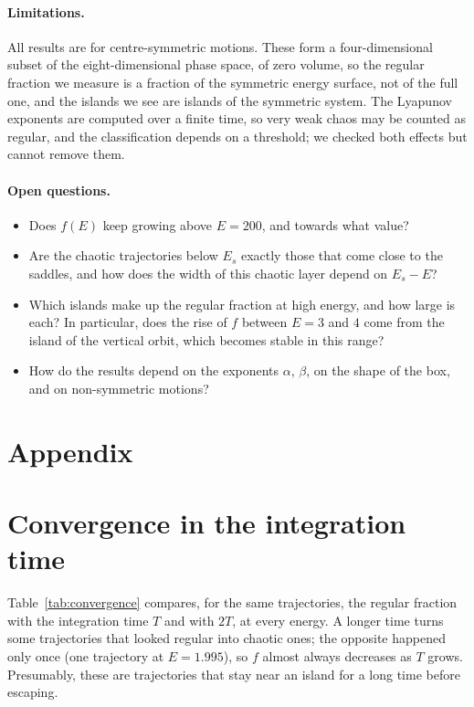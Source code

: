 \documentclass[11pt,a4paper]{article}
\begin{document}
\paragraph{Limitations.}
All results are for centre-symmetric motions. These form a
four-dimensional subset of the eight-dimensional phase space, of zero
volume, so the regular fraction we measure is a fraction of the symmetric
energy surface, not of the full one, and the islands we see are islands of
the symmetric system. The Lyapunov exponents are computed over a finite
time, so very weak chaos may be counted as regular, and the classification
depends on a threshold; we checked both effects but cannot remove them.

\paragraph{Open questions.}
\begin{itemize}
  \item Does $f(E)$ keep growing above $E=200$, and towards what value?
  \item Are the chaotic trajectories below $E_s$ exactly those that come close
        to the saddles, and how does the width of this chaotic layer depend on
        $E_s-E$?
  \item Which islands make up the regular fraction at high energy, and how
        large is each? In particular, does the rise of $f$ between $E=3$ and
        $4$ come from the island of the vertical orbit, which becomes stable
        in this range?
  \item How do the results depend on the exponents $\alpha$, $\beta$, on the
        shape of the box, and on non-symmetric motions?
\end{itemize}

\newpage
\section*{Appendix}
\appendix

\section{Convergence in the integration time}\label{app:convergence}
Table~\ref{tab:convergence} compares, for the same trajectories, the regular
fraction with the integration time $T$ and with $2T$, at every
energy. A longer time turns some trajectories that looked regular into chaotic
ones; the opposite happened only once (one trajectory at $E=1.995$), so $f$ almost always decreases as $T$ grows. Presumably, these are trajectories that stay
near an island for a long time before escaping.
\end{document}
